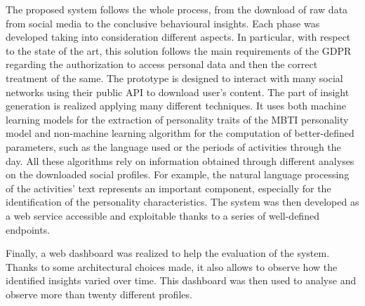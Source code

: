 The proposed system follows the whole process, from the download of raw data from social media to the conclusive behavioural insights. 
Each phase was developed taking into consideration different aspects. In particular, with respect to the state of the art, this solution follows the main requirements of the GDPR regarding the authorization to access personal data and then the correct treatment of the same.
The prototype is designed to interact with many social networks using their public API to download user's content. The part of insight generation is realized applying many different techniques.
It uses both machine learning models for the extraction of personality traits of the MBTI personality model and non-machine learning algorithm for the computation of better-defined parameters, such as the language used or the periods of activities through the day.
All these algorithms rely on information obtained through different analyses on the downloaded social profiles. For example, the natural language processing of the activities' text represents an important component, especially for the identification of the personality characteristics.
The system was then developed as a web service accessible and exploitable thanks to a series of well-defined endpoints.

Finally, a web dashboard was realized to help the evaluation of the system. Thanks to some architectural choices made, it also allows to observe how the identified insights varied over time.
This dashboard was then used to analyse and observe more than twenty different profiles.